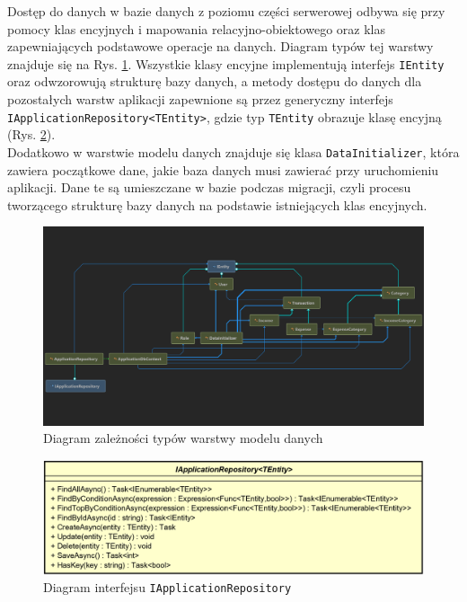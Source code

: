 Dostęp do danych w bazie danych z poziomu części serwerowej odbywa się przy pomocy klas encyjnych i mapowania relacyjno-obiektowego oraz klas zapewniających podstawowe operacje na danych. Diagram typów tej warstwy znajduje się na Rys. \ref{dal_dependecies}. Wszystkie klasy encyjne implementują interfejs \lstinline|IEntity| oraz odwzorowują strukturę bazy danych, a metody dostępu do danych dla pozostałych warstw aplikacji zapewnione są przez generyczny interfejs \lstinline|IApplicationRepository<TEntity>|, gdzie typ \lstinline|TEntity| obrazuje klasę encyjną (Rys. \ref{iapprepository}).\\
Dodatkowo w warstwie modelu danych znajduje się klasa \lstinline|DataInitializer|, która zawiera początkowe dane, jakie baza danych musi zawierać przy uruchomieniu aplikacji. Dane te są umieszczane w bazie podczas migracji, czyli procesu tworzącego strukturę bazy danych na podstawie istniejących klas encyjnych.
\begin{figure}[!ht]
\begin{center}
	\includegraphics[width=6in]{img/diagram/dal_dependencies.png}
	\caption{Diagram zależności typów warstwy modelu danych}
	\label{dal_dependecies}
\end{center}
\end{figure}
\begin{figure}[!ht]
\begin{center}
	\includegraphics[width=6in]{img/diagram/iapprepository.png}
	\caption{Diagram interfejsu \lstinline|IApplicationRepository|}
	\label{iapprepository}
\end{center}
\end{figure}

